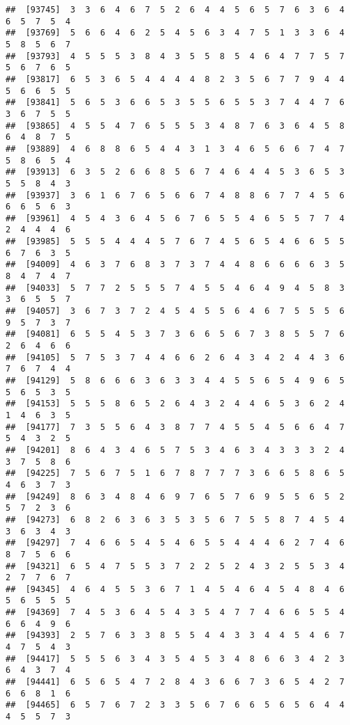 \documentclass[
]{book}
\begin{document}
\begin{verbatim}
##  [93745]  3  3  6  4  6  7  5  2  6  4  4  5  6  5  7  6  3  6  4  6  5  7  5  4
##  [93769]  5  6  6  4  6  2  5  4  5  6  3  4  7  5  1  3  3  6  4  5  8  5  6  7
##  [93793]  4  5  5  5  3  8  4  3  5  5  8  5  4  6  4  7  7  5  7  5  6  7  6  5
##  [93817]  6  5  3  6  5  4  4  4  4  8  2  3  5  6  7  7  9  4  4  5  6  6  5  5
##  [93841]  5  6  5  3  6  6  5  3  5  5  6  5  5  3  7  4  4  7  6  3  6  7  5  5
##  [93865]  4  5  5  4  7  6  5  5  5  3  4  8  7  6  3  6  4  5  8  6  4  8  7  5
##  [93889]  4  6  8  8  6  5  4  4  3  1  3  4  6  5  6  6  7  4  7  5  8  6  5  4
##  [93913]  6  3  5  2  6  6  8  5  6  7  4  6  4  4  5  3  6  5  3  5  5  8  4  3
##  [93937]  3  6  1  6  7  6  5  6  6  7  4  8  8  6  7  7  4  5  6  6  6  5  6  3
##  [93961]  4  5  4  3  6  4  5  6  7  6  5  5  4  6  5  5  7  7  4  2  4  4  4  6
##  [93985]  5  5  5  4  4  4  5  7  6  7  4  5  6  5  4  6  6  5  5  6  7  6  3  5
##  [94009]  4  6  3  7  6  8  3  7  3  7  4  4  8  6  6  6  6  3  5  8  4  7  4  7
##  [94033]  5  7  7  2  5  5  5  7  4  5  5  4  6  4  9  4  5  8  3  3  6  5  5  7
##  [94057]  3  6  7  3  7  2  4  5  4  5  5  6  4  6  7  5  5  5  6  9  5  7  3  7
##  [94081]  6  5  5  4  5  3  7  3  6  6  5  6  7  3  8  5  5  7  6  2  6  4  6  6
##  [94105]  5  7  5  3  7  4  4  6  6  2  6  4  3  4  2  4  4  3  6  7  6  7  4  4
##  [94129]  5  8  6  6  6  3  6  3  3  4  4  5  5  6  5  4  9  6  5  5  6  5  3  5
##  [94153]  5  5  5  8  6  5  2  6  4  3  2  4  4  6  5  3  6  2  4  1  4  6  3  5
##  [94177]  7  3  5  5  6  4  3  8  7  7  4  5  5  4  5  6  6  4  7  5  4  3  2  5
##  [94201]  8  6  4  3  4  6  5  7  5  3  4  6  3  4  3  3  3  2  4  3  7  5  8  6
##  [94225]  7  5  6  7  5  1  6  7  8  7  7  7  3  6  6  5  8  6  5  4  6  3  7  3
##  [94249]  8  6  3  4  8  4  6  9  7  6  5  7  6  9  5  5  6  5  2  5  7  2  3  6
##  [94273]  6  8  2  6  3  6  3  5  3  5  6  7  5  5  8  7  4  5  4  3  6  3  4  3
##  [94297]  7  4  6  6  5  4  5  4  6  5  5  4  4  4  6  2  7  4  6  8  7  5  6  6
##  [94321]  6  5  4  7  5  5  3  7  2  2  5  2  4  3  2  5  5  3  4  2  7  7  6  7
##  [94345]  4  6  4  5  5  3  6  7  1  4  5  4  6  4  5  4  8  4  6  5  6  5  5  5
##  [94369]  7  4  5  3  6  4  5  4  3  5  4  7  7  4  6  6  5  5  4  6  6  4  9  6
##  [94393]  2  5  7  6  3  3  8  5  5  4  4  3  3  4  4  5  4  6  7  4  7  5  4  3
##  [94417]  5  5  5  6  3  4  3  5  4  5  3  4  8  6  6  3  4  2  3  6  4  3  7  4
##  [94441]  6  5  6  5  4  7  2  8  4  3  6  6  7  3  6  5  4  2  7  6  6  8  1  6
##  [94465]  6  5  7  6  7  2  3  3  5  6  7  6  6  5  6  5  6  4  4  4  5  5  7  3

\end{verbatim}
\end{document}
